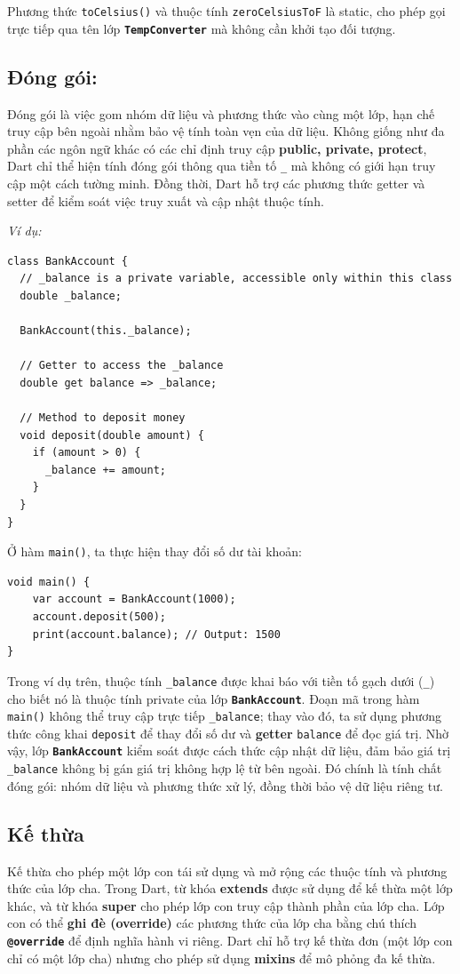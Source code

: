 \documentclass[../DoAn.tex]{subfiles}
\numberwithin{figure}{chapter}
\begin{document}
Phương thức \texttt{toCelsius()} và thuộc tính \texttt{zeroCelsiusToF}  là static, cho phép gọi trực tiếp qua tên lớp \textbf{\texttt{TempConverter}} mà không cần khởi tạo đối tượng.
\subsection{Đóng gói:} 
Đóng gói là việc gom nhóm dữ liệu và phương thức vào cùng một lớp, hạn chế truy cập bên ngoài nhằm bảo vệ tính toàn vẹn của dữ liệu. Không giống như đa phần các ngôn ngữ khác có các chỉ định truy cập \textbf{public, private, protect}, Dart chỉ thể hiện tính đóng gói thông qua tiền tố \texttt{\_} mà không có giới hạn truy cập một cách tường minh. Đồng thời, Dart hỗ trợ các phương thức getter và setter để kiểm soát việc truy xuất và cập nhật thuộc tính. 

\textit{Ví dụ:}
\begin{lstlisting}
class BankAccount {
  // _balance is a private variable, accessible only within this class
  double _balance;

  BankAccount(this._balance);

  // Getter to access the _balance
  double get balance => _balance;

  // Method to deposit money
  void deposit(double amount) {
    if (amount > 0) {
      _balance += amount;
    }
  }
}
\end{lstlisting}

Ở hàm \texttt{main()}, ta thực hiện thay đổi số dư tài khoản:
\begin{lstlisting}
void main() { 
    var account = BankAccount(1000); 
    account.deposit(500); 
    print(account.balance); // Output: 1500 
}
\end{lstlisting}

Trong ví dụ trên, thuộc tính \texttt{\_balance} được khai báo với tiền tố gạch dưới (\texttt{\_}) cho biết nó là thuộc tính private của lớp \textbf{\texttt{BankAccount}}. Đoạn mã trong hàm \texttt{main()} không thể truy cập trực tiếp \texttt{\_balance}; thay vào đó, ta sử dụng phương thức công khai \texttt{deposit} để thay đổi số dư và \textbf{getter} \texttt{balance} để đọc giá trị. Nhờ vậy, lớp \textbf{\texttt{BankAccount}} kiểm soát được cách thức cập nhật dữ liệu, đảm bảo giá trị \texttt{\_balance} không bị gán giá trị không hợp lệ từ bên ngoài. Đó chính là tính chất đóng gói: nhóm dữ liệu và phương thức xử lý, đồng thời bảo vệ dữ liệu riêng tư.

\subsection{Kế thừa} 
Kế thừa cho phép một lớp con tái sử dụng và mở rộng các thuộc tính và phương thức của lớp cha. Trong Dart, từ khóa \textbf{extends} được sử dụng để kế thừa một lớp khác, và từ khóa \textbf{super} cho phép lớp con truy cập thành phần của lớp cha. Lớp con có thể \textbf{ghi đè (override)} các phương thức của lớp cha bằng chú thích \textbf{\texttt{@override}} để định nghĩa hành vi riêng. Dart chỉ hỗ trợ kế thừa đơn (một lớp con chỉ có một lớp cha) nhưng cho phép sử dụng \textbf{mixins} để mô phỏng đa kế thừa. 
\end{document}
